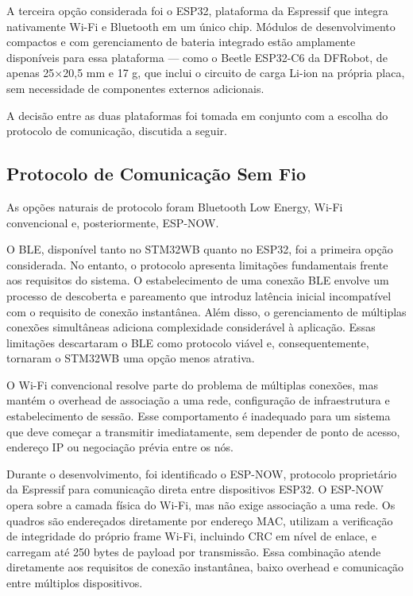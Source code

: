 \documentclass{article}
\begin{document}
    A terceira opção considerada foi o ESP32, plataforma da Espressif que integra
    nativamente Wi-Fi e Bluetooth em um único chip. Módulos de desenvolvimento
    compactos e com gerenciamento de bateria integrado estão amplamente
    disponíveis para essa plataforma — como o Beetle ESP32-C6 da DFRobot, de apenas
    25×20,5 mm e 17 g, que inclui o circuito de carga Li-ion na própria placa, sem
    necessidade de componentes externos adicionais.

    A decisão entre as duas plataformas foi tomada em conjunto com a escolha do protocolo
    de comunicação, discutida a seguir.


    \subsection{Protocolo de Comunicação Sem Fio}

    As opções naturais de protocolo foram Bluetooth Low Energy, Wi-Fi convencional e, posteriormente, ESP-NOW.

    O BLE, disponível tanto no STM32WB quanto no ESP32, foi a primeira opção considerada. No entanto, o protocolo apresenta limitações fundamentais frente aos requisitos do sistema. O estabelecimento de uma conexão BLE envolve um processo de descoberta e pareamento que introduz latência inicial incompatível com o requisito de conexão instantânea. Além disso, o gerenciamento de múltiplas conexões simultâneas adiciona complexidade considerável à aplicação. Essas limitações descartaram o BLE como protocolo viável e, consequentemente, tornaram o STM32WB uma opção menos atrativa.

    O Wi-Fi convencional resolve parte do problema de múltiplas conexões, mas mantém o overhead de associação a uma rede, configuração de infraestrutura e estabelecimento de sessão. Esse comportamento é inadequado para um sistema que deve começar a transmitir imediatamente, sem depender de ponto de acesso, endereço IP ou negociação prévia entre os nós.

    Durante o desenvolvimento, foi identificado o ESP-NOW, protocolo proprietário da Espressif para comunicação direta entre dispositivos ESP32. O ESP-NOW opera sobre a camada física do Wi-Fi, mas não exige associação a uma rede. Os quadros são endereçados diretamente por endereço MAC, utilizam a verificação de integridade do próprio frame Wi-Fi, incluindo CRC em nível de enlace, e carregam até 250 bytes de payload por transmissão. Essa combinação atende diretamente aos requisitos de conexão instantânea, baixo overhead e comunicação entre múltiplos dispositivos.
\end{document}
